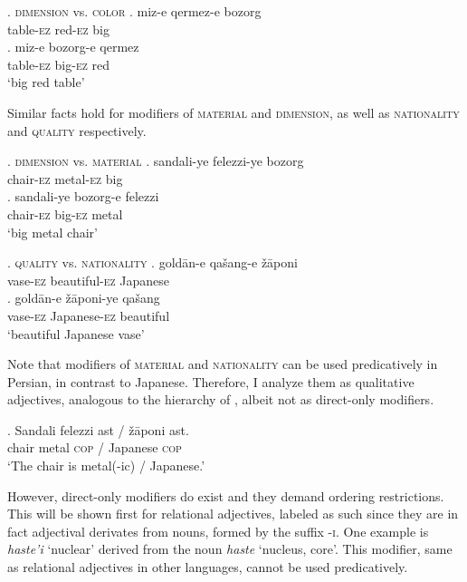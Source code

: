 \documentclass [output=book,colorlinks,citecolor=brown]{langscibook}
\begin{document}

\ex. \textsc{dimension} vs. \textsc{color}
\ag. miz-e qermez-e bozorg\\
table-\textsc{ez} red-\textsc{ez} big\\
\bg. miz-e bozorg-e qermez\\
table-\textsc{ez} big-\textsc{ez} red\\
`big red table'

Similar facts hold for modifiers of \textsc{material} and \textsc{dimension}, as well as \textsc{nationality} and \textsc{quality} respectively.

\ex. \textsc{dimension} vs. \textsc{material}
\ag. sandali-ye felezzi-ye bozorg\\
chair-\textsc{ez} metal-\textsc{ez} big\\
\bg. sandali-ye bozorg-e felezzi\\
chair-\textsc{ez} big-\textsc{ez} metal\\
`big metal chair'

\ex. \textsc{quality} vs. \textsc{nationality}
\ag. goldān-e qašang-e \v{z}āponi\\
vase-\textsc{ez} beautiful-\textsc{ez} Japanese\\
\bg. goldān-e \v{z}āponi-ye qašang\\
vase-\textsc{ez} Japanese-\textsc{ez} beautiful\\
`beautiful Japanese vase'

Note that modifiers of \textsc{material} and \textsc{nationality} can be used predicatively in Persian, in contrast to Japanese. Therefore, I analyze them as qualitative adjectives, analogous to the hierarchy of \citet{scott:2002:stacked}, albeit not as direct-only modifiers. %

\exg. Sandali felezzi ast / \v{z}āponi ast.\\
chair metal \textsc{cop} / Japanese \textsc{cop}\\
`The chair is metal(-ic) / Japanese.’

However, direct-only modifiers do exist and they demand ordering restrictions. This will be shown first for relational adjectives, labeled as such since they are in fact adjectival derivates from nouns, formed by the suffix -\textsc{i}. One example is \textit{haste’i} `nuclear’ derived from the noun \textit{haste} `nucleus, core’. This modifier, same as relational adjectives in other languages, cannot be used predicatively. %
\end{document}
